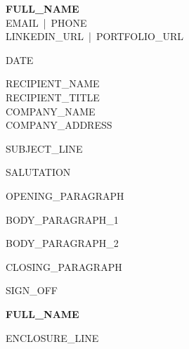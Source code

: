 \documentclass[a4paper,11pt]{article}
\begin{document}
\begin{flushright}
  \textbf{{{FULL_NAME}}}\\
  {{EMAIL}} \,|\, {{PHONE}}\\
  {{LINKEDIN_URL}} \,|\, {{PORTFOLIO_URL}}\\
\end{flushright}

\vspace{1em}
{{DATE}}

\vspace{1em}
{{RECIPIENT_NAME}}\\
{{RECIPIENT_TITLE}}\\
{{COMPANY_NAME}}\\
{{COMPANY_ADDRESS}}

\vspace{1em}
{{SUBJECT_LINE}}

\vspace{1em}
{{SALUTATION}}

{{OPENING_PARAGRAPH}}

{{BODY_PARAGRAPH_1}}

{{BODY_PARAGRAPH_2}}

{{CLOSING_PARAGRAPH}}

\vspace{1em}
{{SIGN_OFF}}

\vspace{2em}
\textbf{{{FULL_NAME}}}

\vspace{2em}
{{ENCLOSURE_LINE}}
\end{document}
